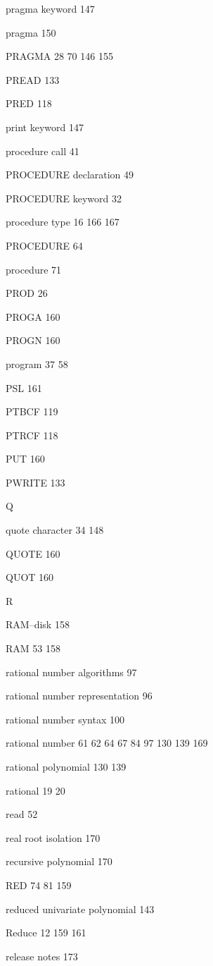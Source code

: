 \item pragma keyword 147
\item pragma 150
\item PRAGMA  28 70 146 155
\item PREAD 133
\item PRED 118
\item print keyword 147
\item procedure call 41
\item PROCEDURE declaration 49
\item PROCEDURE keyword 32
\item procedure type  16 166 167
\item PROCEDURE 64
\item procedure 71
\item PROD 26
\item PROGA 160
\item PROGN 160
\item program  37 58
\item PSL 161
\item PTBCF 119
\item PTRCF 118
\item PUT 160
\item PWRITE 133
\indexspace
\item {\Large Q}
\item quote character  34 148
\item QUOTE 160
\item QUOT 160
\indexspace
\item {\Large R}
\item RAM--disk 158
\item RAM  53 158
\item rational number algorithms 97
\item rational number representation 96
\item rational number syntax   100
\item rational number  61 62 64 67 84 97  130 139 169
\item rational polynomial  130 139
\item rational  19 20
\item read 52
\item real root isolation 170
\item recursive polynomial 170
\item RED  74 81 159
\item reduced univariate polynomial 143
\item Reduce  12 159 161
\item release notes 173
